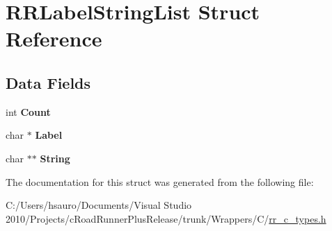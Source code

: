 \hypertarget{struct_r_r_label_string_list}{
\section{\-R\-R\-Label\-String\-List \-Struct \-Reference}
\label{struct_r_r_label_string_list}
}
\subsection*{\-Data \-Fields}
\begin{DoxyCompactItemize}
\item 
\hypertarget{struct_r_r_label_string_list_aad462966ed963f892117056de1eba502}{
int {\bfseries \-Count}}
\label{struct_r_r_label_string_list_aad462966ed963f892117056de1eba502}

\item 
\hypertarget{struct_r_r_label_string_list_af91fd2b26f73a15052d23933bee0ed5a}{
char $\ast$ {\bfseries \-Label}}
\label{struct_r_r_label_string_list_af91fd2b26f73a15052d23933bee0ed5a}

\item 
\hypertarget{struct_r_r_label_string_list_acdbc34377baf3e52d9044aada0f2f511}{
char $\ast$$\ast$ {\bfseries \-String}}
\label{struct_r_r_label_string_list_acdbc34377baf3e52d9044aada0f2f511}

\end{DoxyCompactItemize}


\-The documentation for this struct was generated from the following file\-:\begin{DoxyCompactItemize}
\item 
\-C\-:/\-Users/hsauro/\-Documents/\-Visual Studio 2010/\-Projects/c\-Road\-Runner\-Plus\-Release/trunk/\-Wrappers/\-C/\hyperlink{rr__c__types_8h}{rr\-\_\-c\-\_\-types.\-h}\end{DoxyCompactItemize}
